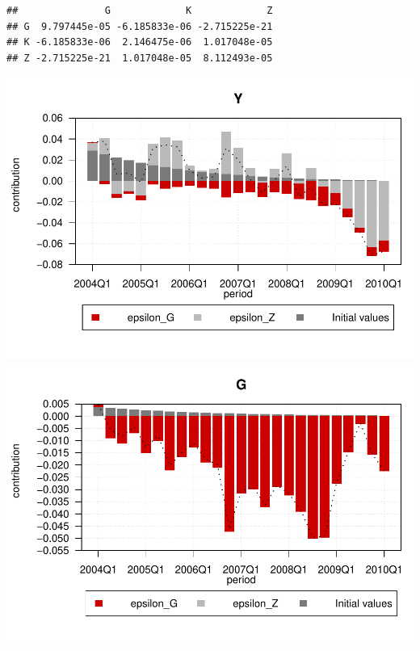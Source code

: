 \documentclass[12pt,a4paper,]{article}
\newcommand{\0}{\mathbf{0}}
\newenvironment{Shaded}{\begin{snugshade}}{\end{snugshade}}
\newcommand{\CommentTok}[1]{\textcolor[rgb]{0.56,0.35,0.01}{\textit{#1}}}
\newcommand{\NormalTok}[1]{#1}
\newcommand{\OperatorTok}[1]{\textcolor[rgb]{0.81,0.36,0.00}{\textbf{#1}}}
\begin{document}
\begin{Shaded}
\end{Shaded}

\begin{verbatim}
##               G             K             Z
## G  9.797445e-05 -6.185833e-06 -2.715225e-21
## K -6.185833e-06  2.146475e-06  1.017048e-05
## Z -2.715225e-21  1.017048e-05  8.112493e-05
\end{verbatim}

\begin{center}\includegraphics{figure/minimal-dsge6-1} \includegraphics{figure/minimal-dsge6-2} \end{center}
\end{document}
